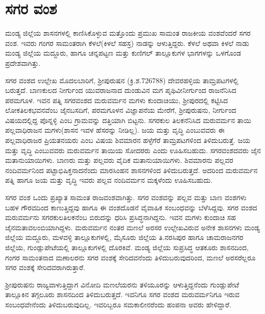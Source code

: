\section*{ಸಗರ ವಂಶ}

ಮಂಡ್ಯ ಜಿಲ್ಲೆಯ ಶಾಸನಗಳಲ್ಲಿ ಕಾಣಿಸಿಕೊಳ್ಳುವ ಮತ್ತೊಂದು ಪ್ರಮುಖ ಸಾಮಂತ ರಾಜಕೀಯ ವಂಶವೆಂದರೆ ಸಗರ ವಂಶ. ಇವರು ಗಂಗರ ಸಾಮಂತರಾಗಿ ಕೆಳಲೆ(ಕಿಳಲೆ ಸಹಸ್ರ) ನಾಡನ್ನು ಆಳುತ್ತಿದ್ದರು. ಕೆಳಲೆ ಅಥವಾ ಕಿಳಲೆ ನಾಡು ಮಂಡ್ಯ ಜಿಲ್ಲೆಯ ಮದ್ದೂರು, ಹಾಗೂ ಚನ್ನಪಟ್ಟಣ ಮತ್ತು ಕುಣಿಗಲ್​ ತಾಲ್ಲೂಕುಗಳ ಭಾಗಗಳನ್ನು ಒಳಗೊಂಡ ಪ್ರದೇಶವಾಗಿತ್ತು.

ಸಗರ ವಂಶದ ಉಲ್ಲೇಖ ಮೊದಲಬಾರಿಗೆ, ಶ‍್ರೀಪುರುಷನ (ಕ್ರಿ.ಶ.726\enginline{-}788) ದೇವರಹಳ್ಳಿಯ ತಾಮ್ರಪಟಗಳಲ್ಲಿ ಬರುತ್ತದೆ. ಬಾಣಕುಲದ ನೀರ್ಗುಂದ ಯುವರಾಜನಾದ ದುಂಡುವಿನ ಮಗ ಪೃಥಿವೀನೀರ್ಗುಂದ ರಾಜನೆನಿಸಿದ ಪರಮಗೂಳ. ಇವನ ಪತ್ನಿ ಸಗರವಂಶದ ಮರುವರ್ಮನ ಮಗಳು ಕುಂದಾಚಿಯು, ಶ‍್ರೀಪುರದಲ್ಲಿ ಕಟ್ಟಿಸಿದ ಲೋಕತಿಲಕಭವನವೆಂಬ ಜೈನಬಸದಿಗೆ, ಪರಮಗೂಳನ ವಿಜ್ಞಾಪನೆಯ ಮೇರೆಗೆ, ಶ‍್ರೀಪುರುಷನು, ನೀರ್ಗುಂದ ವಿಷಯದಲ್ಲಿದ್ದ ಪೊನ್ನಳ್ಳಿ ಎಂಬ ಗ್ರಾಮವನ್ನು ದತ್ತಿಯಾಗಿ ಬಿಟ್ಟನು. ಸಗರಕುಲ ತಿಲಕನೆನಿಸಿದ ಮರುವರ್ಮನ ತಾಯಿ ಪಲ್ಲವಾಧಿರಾಜನ ಮಗಳು(ಶಾಸನ ಇವಳ ಹೆಸರನ್ನು ನೀಡಿಲ್ಲ). ಜಯ ಮತ್ತು ವೃದ್ಧಿ ಎಂಬುವವರು ಈ ಪಲ್ಲವಾಧಿರಾಜರ ಪ್ರಿಯತನಯರು ಎಂಬ ವಿಷಯ ಶಿವಮಾರನ ಹಳ್ಳೆಗೆರೆ ತಾಮ್ರಪಟಗಳಿಂದ ತಿಳಿದುಬರುತ್ತೆ. ಜಯ ಮತ್ತು ವೃದ್ಧಿ ಎಂಬುವವರು ಮರುವರ್ಮನ ತಾಯಿಯ ಸೋದರರು ಎಂದು ಊಹಿಸಬಹುದು. ಸಗರವಂಶದವರು ಜೈನ ಮತಾನುಯಾಯಿಗಳು. ಬಾಣರು ಮತ್ತು ಪಲ್ಲವರು ವೈದಿಕ ಮತಾನುಯಾಯಿಗಳು. ಶಿವಮಾರನು ಪಲ್ಲವರ ನಂದಿವರ್ಮನಿಂದ ಪಟ್ಟಾಭಿಷಿಕ್ತನಾದನೆಂದು ಮಾರಸಿಂಹನ ಶಾಸನಗಳಿಂದ ತಿಳಿದುಬರುತ್ತದೆ. ಅದರಿಂದ ಮರುವರ್ಮನ ಪತ್ನಿ ಹಾಗೂ ಜಯ ಮತ್ತು ವೃದ್ಧಿ ಇವರು ಪಲ್ಲವ ನಂದಿವರ್ಮನ ಮಕ್ಕಳೆಂದು ಊಹಿಸಬಹುದು.

ಸಗರ ವಂಶ ಒಂದು ಪ್ರಖ್ಯಾತ ಸಾಮಂತ ರಾಜವಂಶವಾಗಿತ್ತು. ಸಗರ ವಂಶವನ್ನು ಪಲ್ಲವ ಮತ್ತು ಬಾಣ ವಂಶಗಳು ಬಹಳ ಗೌರವದಿಂದ ಕಾಣುತ್ತಿದ್ದವು ಹಾಗೂ ಈ ವಂಶದೊಡನೆ ವೈವಾಹಿಕ ಸಂಬಂಧವನ್ನು ಬೆಳೆಸಿದ್ದವು. ಸಗರ ವಂಶದ ಮರುವರ್ಮನು ಸಗರಕುಲತಿಲಕನೆಂಬ ಬಿರುದನ್ನು ಧರಿಸಿ ಪ್ರಸಿದ್ಧನಾಗಿದ್ದನು. ಇವನ ಮಗಳು ಕುಂದಾಚಿ ಸಹ ಜೈನಮತಾವಲಂಬಿಯಾಗಿದ್ದಳು. ಮರುವರ್ಮನ ನಂತರ ಮಣಲೆ ಅರಸರ ಉಲ್ಲೇಖವಿರುವ ಅನೇಕ ಶಾಸನಗಳು ಮಂಡ್ಯ ಜಿಲ್ಲೆಯ ಮದ್ದೂರು, ಮಳವಳ್ಳಿ ತಾಲ್ಲೂಕುಗಳಲ್ಲಿ, ಮೈಸೂರು ಜಿಲ್ಲೆಯ ತಿ.ನರಸಿಪುರ ಹಾಗೂ ಚಾಮರಾಜನಗರ ಜಿಲ್ಲೆಯ, ಗುಂಡ್ಲುಪೇಟೆಯಲ್ಲಿ ತಾಲ್ಲೂಕುಗಳಲ್ಲಿ ದೊರಕಿವೆ. ಮಂಡ್ಯ ಜಿಲ್ಲೆಯ ಸುಪ್ರಸಿದ್ಧ ಆತಕೂರು ಶಾಸನದಿಂದ, ಗಂಗರ ಸಾಮಂತನಾದ ಮಣಾಲರನು ಸಗರ ವಂಶಕ್ಕೆ ಸೇರಿದವನೆಂದು ತಿಳಿದುಬರುವುದರಿಂದ, ಮಣಲೆ ಅರಸರೆಲ್ಲರೂ ಸಗರ ವಂಶಕ್ಕೆ ಸೇರಿದವರಾಗಿರುತ್ತಾರೆ.

ಶ‍್ರೀಪುರುಷನು ರಾಜ್ಯವಾಳುತ್ತಿದ್ದಾಗ ವಿನೋದಿ ಮಣಲೆಯರನು ತಳಿಯೂರನ್ನು ಆಳುತ್ತಿದ್ದನೆಂದು ಗುಂಡ್ಲುಪೇಟೆ ತಾಲ್ಲೂಕಿನ ತಗ್ಗಲೂರು ಶಾಸನದಿಂದ ತಿಳಿದುಬರುತ್ತದೆ. ಇವನಿಗೂ ಸಗರ ವಂಶದ ಮರುವರ್ಮನಿಗೂ ಇರುವ ಸಂಬಂಧವೇನೆಂದು ತಿಳಿದುಬರುವುದಿಲ್ಲ. ಇವರಿಬ್ಬರೂ ಸಮಕಾಲೀನರೆಂದು ಹಂಪನಾ ಅವರು ಹೇಳಿದ್ದಾರೆ.


